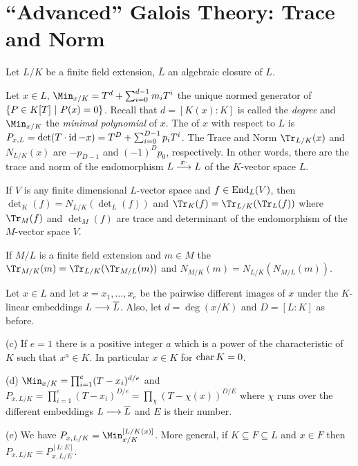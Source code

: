 \documentclass[a4paper,parskip=full,numbers=enddot]{scrreprt}
\begin{document}
\section*{``Advanced'' Galois Theory: Trace and Norm}
    Let $L/K$ be a finite field extension, $\overline{L}$ an algebraic closure of $L$.
    \begin{defi}
        Let $x\in L$, $\Min_{x/K} = T^d +\sum_{i=0}^{d-1} m_i  T^i$ the unique normed generator of $\left\{P\in K[T]\st P(x) = 0\right\}$. Recall that $d=[K(x):K]$ is called the \emph{degree} and $\Min_{x/K}$ the \emph{minimal polynomial} of $x$. The  of $x$ with respect to $L$ is $P_{x,L} = \det(T\cdot \id -x) = T^D +\sum_{i=0}^{D-1} p_iT^i$. The Trace and Norm $\Tr_{L/K}(x)$ and $N_{L/K}(x)$ are $-p_{D-1}$ and $(-1)^Dp_0$, respectively. In other words, there are the trace and norm of the endomorphism $L\morphism[x\cdot] L$ of the $K$-vector space $L$.
    \end{defi}
    \begin{thm}
        \begin{alphanumerate}
            \item
                If $V$ is any finite dimensional $L$-vector space and $f\in \End_L(V)$, then $\det_K(f) = N_{L/K}( \det_L(f))$ and $\Tr_K(f) = \Tr_{L/K}(\Tr_L(f))$ where $\Tr_M(f)$ and $\det_M(f)$ are trace and determinant of the endomorphism of the $M$-vector space $V$.
            \item 
                If $M/L$ is a finite field extension and $m\in M$ the $\Tr_{M/K}(m) = \Tr_{L/K}(\Tr_{M/L}(m))$ and $N_{M/K}(m) = N_{L/K}(N_{M/L}(m))$.
        \end{alphanumerate}
        Let $x\in L$ and let $x=x_1,\ldots, x_e$ be the pairwise different images of $x$ under the $K$-linear embeddings $L\morphism \overline{L}$. Also, let $d=\deg(x/K)$ and $D= [L:K]$ as before.
        \begin{alphanumerate}
            \item[(c)]
                If $e=1$ there is a positive integer $a$ which is a power of the characteristic of $K$ such that $x^a\in K$. In particular $x\in K$ for $\cha K = 0$.
            \item[(d)]
                $\Min_{x/K} = \prod_{i=1}^e (T-x_i)^{d/e}$ and $P_{x,L/K} = \prod_{i=1}^e (T-x_i)^{D/e} = \prod_{\chi}(T-\chi(x))^{D/E}$ where $\chi$ runs over the different embeddings $L\morphism \overline{L}$ and $E$ is their number.
            \item[(e)]
                We have $P_{x,L/K}=\Min_{x/K}^{[L/K(x)]}$. More general, if $K\subseteq F \subseteq L$ and $x\in F$ then $P_{x,L/K} = P_{x,L/E}^{[L:E]}$.
        \end{alphanumerate}
    \end{thm}
\end{document}

